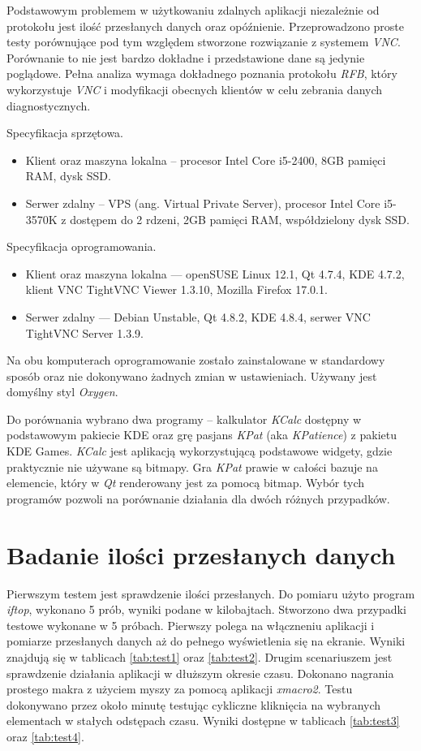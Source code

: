 Podstawowym problemem w użytkowaniu zdalnych aplikacji niezależnie od protokołu jest ilość przesłanych danych oraz opóźnienie. Przeprowadzono proste testy porównujące pod tym względem stworzone rozwiązanie z systemem \emph{VNC}. Porównanie to nie jest bardzo dokładne i przedstawione dane są jedynie poglądowe. Pełna analiza wymaga dokładnego poznania protokołu \emph{RFB}, który wykorzystuje \emph{VNC} i modyfikacji obecnych klientów w celu zebrania danych diagnostycznych.

Specyfikacja sprzętowa.
\begin{itemize}
\item Klient oraz maszyna lokalna -- procesor Intel Core i5-2400, 8GB pamięci RAM, dysk SSD.
\item Serwer zdalny -- VPS (ang. Virtual Private Server), procesor Intel Core i5-3570K z dostępem do 2 rdzeni, 2GB pamięci RAM, współdzielony dysk SSD.
\end{itemize}

Specyfikacja oprogramowania.
\begin{itemize}
\item Klient oraz maszyna lokalna --- openSUSE Linux 12.1, Qt 4.7.4, KDE 4.7.2, klient VNC TightVNC Viewer 1.3.10, Mozilla Firefox 17.0.1.
\item Serwer zdalny --- Debian Unstable, Qt 4.8.2, KDE 4.8.4, serwer VNC TightVNC Server 1.3.9.
\end{itemize}

Na obu komputerach oprogramowanie zostało zainstalowane w standardowy sposób oraz nie dokonywano żadnych zmian w ustawieniach. Używany jest domyślny styl \emph{Oxygen}.

Do porównania wybrano dwa programy -- kalkulator \emph{KCalc} dostępny w podstawowym pakiecie KDE oraz grę pasjans \emph{KPat} (aka \emph{KPatience}) z pakietu KDE Games. \emph{KCalc} jest aplikacją wykorzystującą podstawowe widgety, gdzie praktycznie nie używane są bitmapy. Gra \emph{KPat} prawie w całości bazuje na elemencie, który w \emph{Qt} renderowany jest za pomocą bitmap. Wybór tych programów pozwoli na porównanie działania dla dwóch różnych przypadków.

\section{Badanie ilości przesłanych danych}

Pierwszym testem jest sprawdzenie ilości przesłanych. Do pomiaru użyto program \emph{iftop}, wykonano 5 prób, wyniki podane w kilobajtach.
Stworzono dwa przypadki testowe wykonane w 5 próbach. Pierwszy polega na włączneniu aplikacji i pomiarze przesłanych danych aż do pełnego wyświetlenia się na ekranie. Wyniki znajdują się w tablicach \ref{tab:test1} oraz \ref{tab:test2}. Drugim scenariuszem jest sprawdzenie działania aplikacji w dłuższym okresie czasu. Dokonano nagrania prostego makra z użyciem myszy za pomocą aplikacji \emph{xmacro2}. Testu dokonywano przez około minutę testując cykliczne kliknięcia na wybranych elementach w stałych odstępach czasu. Wyniki dostępne w tablicach \ref{tab:test3} oraz \ref{tab:test4}.


